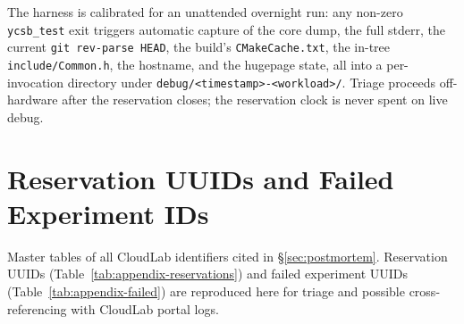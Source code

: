 \documentclass[11pt,a4paper]{article}
\begin{document}
\begin{table}[H]
\centering
\scriptsize
\caption{Off-hardware tooling for the CXL evaluation.}
\label{tab:tooling}
\end{table}

The harness is calibrated for an unattended overnight run: any non-zero \texttt{ycsb\_test} exit triggers automatic capture of the core dump, the full stderr, the current \texttt{git rev-parse HEAD}, the build's \texttt{CMakeCache.txt}, the in-tree \texttt{include/Common.h}, the hostname, and the hugepage state, all into a per-invocation directory under \texttt{debug/<timestamp>-<workload>/}. Triage proceeds off-hardware after the reservation closes; the reservation clock is never spent on live debug.

\section{Reservation UUIDs and Failed Experiment IDs}
\label{app:failed-experiments}

Master tables of all CloudLab identifiers cited in §\ref{sec:postmortem}. Reservation UUIDs (Table~\ref{tab:appendix-reservations}) and failed experiment UUIDs (Table~\ref{tab:appendix-failed}) are reproduced here for triage and possible cross-referencing with CloudLab portal logs.
\end{document}
